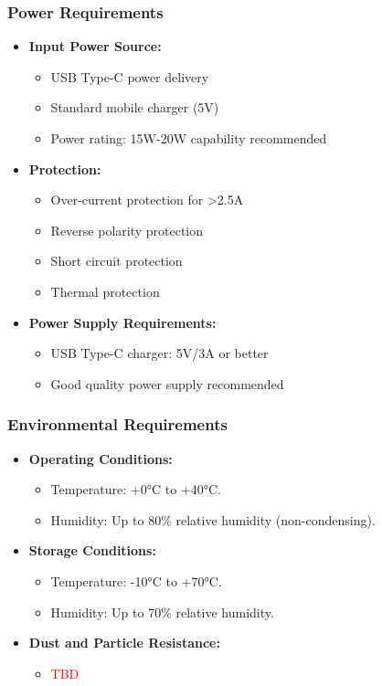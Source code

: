 \documentclass[a4paper,12pt]{article}
\begin{document}
\subsubsection{Power Requirements}
\begin{itemize}
    \item \textbf{Input Power Source:}
    \begin{itemize}
        \item USB Type-C power delivery
        \item Standard mobile charger (5V)
        \item Power rating: 15W-20W capability recommended

    \end{itemize}
    \item \textbf{Protection:}
    \begin{itemize}
        \item Over-current protection for >2.5A
        \item Reverse polarity protection
        \item Short circuit protection
        \item Thermal protection

    \end{itemize}
    
    \item \textbf{Power Supply Requirements:}
    \begin{itemize}
        \item USB Type-C charger: 5V/3A or better
        \item Good quality power supply recommended
    \end{itemize}
\end{itemize}
    
\subsubsection{Environmental Requirements}
\begin{itemize}
    \item \textbf{Operating Conditions:}
    \begin{itemize}
        \item Temperature: +0°C to +40°C.
        \item Humidity: Up to 80\% relative humidity (non-condensing).
    \end{itemize}
    \item \textbf{Storage Conditions:}
    \begin{itemize}
        \item Temperature: -10°C to +70°C.
        \item Humidity: Up to 70\% relative humidity.
    \end{itemize}
    \item \textbf{Dust and Particle Resistance:}
    \begin{itemize}
        \item \textcolor{red}{TBD}
    \end{itemize}
\end{itemize}
\end{document}

